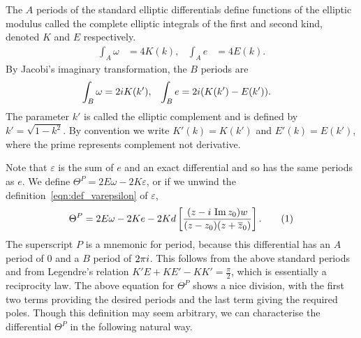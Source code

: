 \documentclass{article}
\begin{document}


The $A$ periods of the standard elliptic differentials define functions of the elliptic modulus called the complete elliptic integrals of the first and second kind, denoted $K$ and $E$ respectively.
\begin{align*}
    \int_{A} \omega &= 4K(k), &
    \int_{A} e &= 4E(k).
\end{align*}
By Jacobi's imaginary transformation,
the $B$ periods are
\begin{align*}
\int_{B} \omega &= 2i K(k'), &
\int_{B} e &= 2i(K(k')-E(k')).
\end{align*}
The parameter $k'$ is called the elliptic complement and is defined by $k' = \sqrt{1-k^2}$. By convention we write $K'(k) = K(k')$ and $E'(k) = E(k')$, where the prime represents complement not derivative. 

Note that $\varepsilon$ is the sum of $e$ and an exact differential and so has the same periods as $e$. We define $\Theta^P = 2E\omega - 2K\varepsilon$, or if we unwind the definition~\eqref{eqn:def_varepsilon} of $\varepsilon$,
\[
\Theta^P = 2E \omega - 2Ke - 2K d\left[ \frac{(z-\iu\,\Imag z_0)w}{(z-z_0)(z + \bar{z}_0)} \right].
\labelthis{eqn:thetaP}
\]
The superscript $P$ is a mnemonic for period, because this differential has an $A$ period of $0$ and a $B$ period of $2\pi i$. This follows from the above standard periods and from Legendre's relation $K'E + KE' - KK' = \frac{\pi}{2}$,
which is essentially a reciprocity law.
The above equation for $\Theta^P$ shows a nice division, with the first two terms providing the desired periods and the last term giving the required poles. Though this definition may seem arbitrary, we can characterise the differential $\Theta^P$ in the following natural way.
\end{document}
